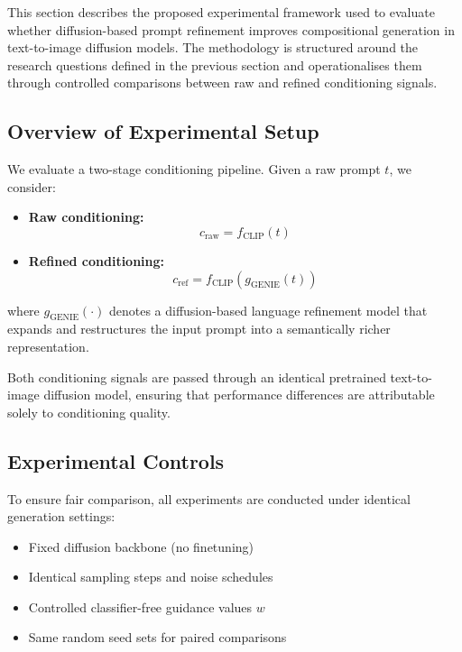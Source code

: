 \documentclass[a4paper,twoside,12pt]{report}
\begin{document}
This section describes the proposed experimental framework used to evaluate whether diffusion-based prompt refinement improves compositional generation in text-to-image diffusion models. The methodology is structured around the research questions defined in the previous section and operationalises them through controlled comparisons between raw and refined conditioning signals.


\subsection{Overview of Experimental Setup}

We evaluate a two-stage conditioning pipeline. Given a raw prompt \(t\), we consider:

\begin{itemize}
    \item \textbf{Raw conditioning:} 
    \[
    c_{\mathrm{raw}} = f_{\mathrm{CLIP}}(t)
    \]

    \item \textbf{Refined conditioning:}
    \[
    c_{\mathrm{ref}} = f_{\mathrm{CLIP}}\!\left(g_{\mathrm{GENIE}}(t)\right)
    \]
\end{itemize}

where \(g_{\mathrm{GENIE}}(\cdot)\) denotes a diffusion-based language refinement model that expands and restructures the input prompt into a semantically richer representation.

Both conditioning signals are passed through an identical pretrained text-to-image diffusion model, ensuring that performance differences are attributable solely to conditioning quality.


\subsection{Experimental Controls}

To ensure fair comparison, all experiments are conducted under identical generation settings:

\begin{itemize}
    \item Fixed diffusion backbone (no finetuning)
    \item Identical sampling steps and noise schedules
    \item Controlled classifier-free guidance values \(w\)
    \item Same random seed sets for paired comparisons
\end{itemize}
\end{document}
